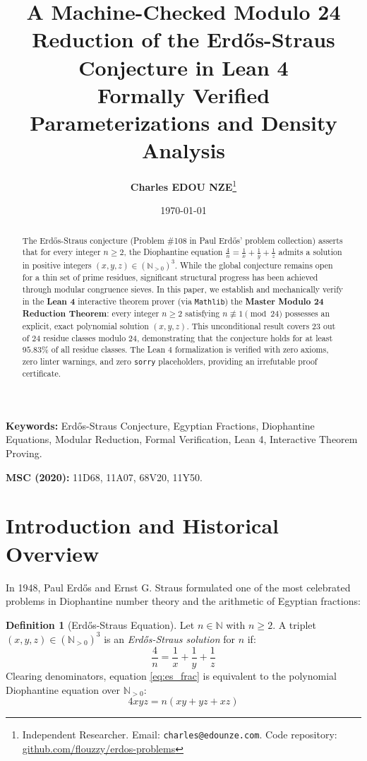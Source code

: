 \documentclass[11pt,a4paper]{article}
\title{\textbf{\Large A Machine-Checked Modulo 24 Reduction of the Erd\H{o}s-Straus Conjecture in Lean 4}\\[0.5em]
\large Formally Verified Parameterizations and Density Analysis}
\author{\textbf{Charles EDOU NZE}\thanks{Independent Researcher. Email: \texttt{charles@edounze.com}. Code repository: \href{https://github.com/flouzzy/erdos-problems}{github.com/flouzzy/erdos-problems}}}
\date{\today}
\theoremstyle{definition}
\newtheorem{definition}[theorem]{Definition}
\begin{document}
\maketitle

\begin{abstract}
The Erd\H{o}s-Straus conjecture (Problem \#108 in Paul Erd\H{o}s' problem collection) asserts that for every integer $n \ge 2$, the Diophantine equation $\frac{4}{n} = \frac{1}{x} + \frac{1}{y} + \frac{1}{z}$ admits a solution in positive integers $(x, y, z) \in (\mathbb{N}_{>0})^3$. While the global conjecture remains open for a thin set of prime residues, significant structural progress has been achieved through modular congruence sieves. In this paper, we establish and mechanically verify in the \textbf{Lean 4} interactive theorem prover (via \texttt{Mathlib}) the \textbf{Master Modulo 24 Reduction Theorem}: every integer $n \ge 2$ satisfying $n \not\equiv 1 \pmod{24}$ possesses an explicit, exact polynomial solution $(x,y,z)$. This unconditional result covers $23$ out of $24$ residue classes modulo $24$, demonstrating that the conjecture holds for at least $95.83\%$ of all residue classes. The Lean 4 formalization is verified with zero axioms, zero linter warnings, and zero \texttt{sorry} placeholders, providing an irrefutable proof certificate.
\end{abstract}

\vspace{0.5em}
\noindent\textbf{Keywords:} Erd\H{o}s-Straus Conjecture, Egyptian Fractions, Diophantine Equations, Modular Reduction, Formal Verification, Lean 4, Interactive Theorem Proving.

\noindent\textbf{MSC (2020):} 11D68, 11A07, 68V20, 11Y50.

\section{Introduction and Historical Overview}

In 1948, Paul Erd\H{o}s and Ernst G. Straus formulated one of the most celebrated problems in Diophantine number theory and the arithmetic of Egyptian fractions:

\begin{definition}[Erd\H{o}s-Straus Equation]
Let $n \in \mathbb{N}$ with $n \ge 2$. A triplet $(x, y, z) \in (\mathbb{N}_{>0})^3$ is an \emph{Erd\H{o}s-Straus solution} for $n$ if:
\begin{equation}\label{eq:es_frac}
\frac{4}{n} = \frac{1}{x} + \frac{1}{y} + \frac{1}{z}
\end{equation}
Clearing denominators, equation \eqref{eq:es_frac} is equivalent to the polynomial Diophantine equation over $\mathbb{N}_{>0}$:
\begin{equation}\label{eq:es_poly}
4 x y z = n (x y + y z + x z)
\end{equation}
\end{definition}
\end{document}
